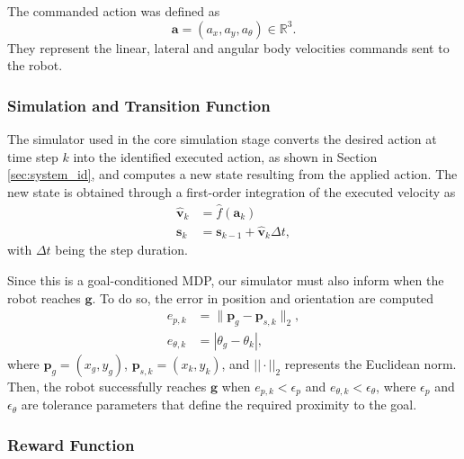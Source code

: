 The commanded action was defined as 
\begin{equation}
    \mathbf{a} = (a_x, a_y, a_\theta) \in \mathbb{R}^3.
\end{equation}
They represent the linear, lateral and angular body velocities commands sent to the robot. 

\subsubsection{Simulation and Transition Function}

The simulator used in the core simulation stage converts the desired action at time step $k$ into the identified executed action, as shown in Section \ref{sec:system_id}, and computes a new state resulting from the applied action. The new state is obtained through a first-order integration of the executed velocity as
\begin{align}
    \hat{\mathbf{v}}_k &= \hat{f}(\mathbf{a}_k) \\
    \mathbf{s}_k &= \mathbf{s}_{k-1} + \hat{\mathbf{v}}_k\Delta t,
\end{align}
with $\Delta t$ being the step duration.

Since this is a goal-conditioned MDP, our simulator must also inform when the robot reaches $\mathbf{g}$. To do so, the error in position and orientation are computed
\begin{align}
    e_{p,k} &= \|\mathbf{p}_g-\mathbf{p}_{s,k}\|_2, \\
    e_{\theta,k} &= |\theta_g - \theta_{k}|,
\end{align}
where $\mathbf{p}_g = (x_g, y_g)$, $\mathbf{p}_{s,k} =(x_k, y_k)$, and $||\cdot||_2$ represents the Euclidean norm. Then, the robot successfully reaches $\mathbf{g}$ when $e_{p,k} < \epsilon_p$ and $e_{\theta,k} < \epsilon_\theta$, where $\epsilon_p$ and $\epsilon_\theta$ are tolerance parameters that define the required proximity to the goal.

\subsubsection{Reward Function}

